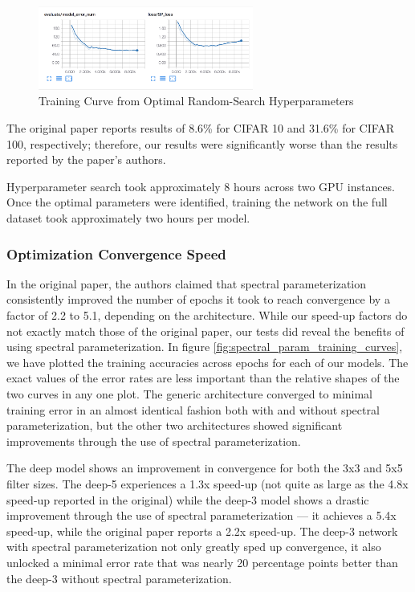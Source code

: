 \documentclass[10pt,journal,compsoc]{IEEEtran}
\begin{document}
\begin{figure}
\centering
  \includegraphics[width=200pt]{images/Training_Curve_10.png}
  \caption{Training Curve from Optimal Random-Search Hyperparameters}
  \label{fig:train_curve}
\end{figure}

The original paper reports results of 8.6\% for CIFAR 10 and 31.6\% for CIFAR 100, respectively; therefore, our results were significantly worse than the results reported by the paper's authors.

Hyperparameter search took approximately 8 hours across two GPU instances. Once the optimal parameters were identified, training the network on the full dataset took approximately two hours per model.

\subsubsection{Optimization Convergence Speed}\label{ssec:spec_conv_results}

In the original paper, the authors claimed that spectral parameterization consistently improved the number of epochs it took to reach convergence by a factor of 2.2 to 5.1, depending on the architecture. While our speed-up factors do not exactly match those of the original paper, our tests did reveal the benefits of using spectral parameterization. In figure \ref{fig:spectral_param_training_curves}, we have plotted the training accuracies across epochs for each of our models. The exact values of the error rates are less important than the relative shapes of the two curves in any one plot. The generic architecture converged to minimal training error in an almost identical fashion both with and without spectral parameterization, but the other two architectures showed significant improvements through the use of spectral parameterization.

The deep model shows an improvement in convergence for both the 3x3 and 5x5 filter sizes. The deep-5 experiences a 1.3x speed-up (not quite as large as the 4.8x speed-up reported in the original) while the deep-3 model shows a drastic improvement through the use of spectral parameterization — it achieves a 5.4x speed-up, while the original paper reports a 2.2x speed-up. The deep-3 network with spectral parameterization not only greatly sped up convergence, it also unlocked a minimal error rate that was nearly 20 percentage points better than the deep-3 without spectral parameterization.
\end{document}
